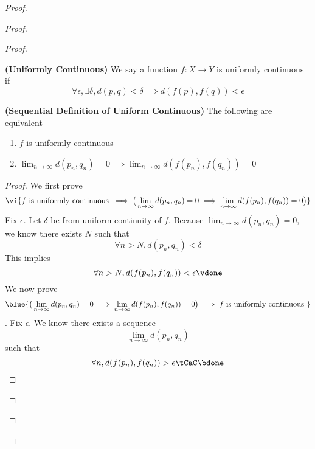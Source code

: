 \documentclass{report}
\begin{document}
\begin{proof}
\begin{proof}
\begin{proof}
\begin{definition}
\label{5.3.1}
\textbf{(Uniformly Continuous)} We say a function $f:X\rightarrow Y$ is uniformly continuous if 
\begin{equation*}
\forall \epsilon, \exists \delta, d(p,q)<\delta \implies d(f(p),f(q))<\epsilon 
\end{equation*}
\end{definition}
\begin{theorem}
\label{5.3.2}
\textbf{(Sequential Definition of Uniform Continuous)} The following are equivalent
\begin{enumerate}[label=(\alph*)]
  \item $f$ is uniformly continuous
  \item $\lim_{n\to \infty}d(p_n,q_n)=0 \implies \lim_{n\to \infty}d(f(p_n),f(q_n))=0$ 
\end{enumerate}
\end{theorem}
\begin{proof}
We first prove
\begin{equation*}
  \vi{f\text{  is uniformly continuous }\implies \big(\lim_{n\to\infty}d(p_n,q_n)=0\implies \lim_{n\to\infty}d(f(p_n),f(q_n))=0\big)}
\end{equation*}
Fix $\epsilon $. Let  $\delta$ be from uniform continuity of $f$. Because $\lim_{n\to\infty}d(p_n,q_n)=0$, we know there exists $N$ such that 
 \begin{equation*}
\forall n>N, d(p_n,q_n)<\delta
\end{equation*}
This implies 
\begin{equation*}
\forall n>N, d(f(p_n),f(q_n))<\epsilon \vdone
\end{equation*}
We now prove
\begin{equation*}
\blue{\big( \lim_{n\to\infty} d(p_n,q_n)=0 \implies \lim_{n\to\infty}d(f(p_n),f(q_n))=0 \big) \implies f\text{ is uniformly continuous }}
\end{equation*}
. Fix $\epsilon $. We know there exists a sequence 
\begin{equation*}
\lim_{n\to \infty}d(p_n,q_n)
\end{equation*}
such that 
\begin{equation*}
\forall n, d(f(p_n),f(q_n))>\epsilon \tCaC \bdone
\end{equation*}






\end{proof}
\end{proof}
\end{proof}
\end{proof}
\end{document}
